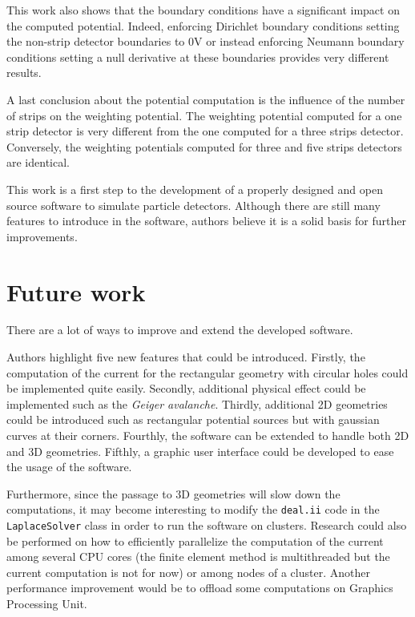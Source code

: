 \documentclass[11pt]{article}
\begin{document}
	This work also shows that the boundary conditions have a significant impact
	on the computed potential. Indeed, enforcing Dirichlet boundary conditions setting
	the non-strip detector boundaries to 0V or instead enforcing Neumann boundary
	conditions setting a null derivative at these boundaries provides very
	different results.

  A last conclusion about the potential computation is the influence of the
	number of strips on the weighting potential. The weighting potential computed
	for a one strip detector is very different from the one computed for a three
	strips detector. Conversely, the weighting potentials computed for three and five
	strips detectors are identical.


	This work is a first step to the development of a properly designed and open source
	software to simulate particle detectors. Although there are still
	many features to introduce in the software, authors believe it is a solid
	basis for further improvements.



	\section*{Future work}

		There are a lot of ways to improve and extend the developed software.

		Authors highlight five new features that could be introduced. Firstly, the
		computation of the current for the
		rectangular geometry with circular holes could be implemented quite easily.
		Secondly, additional physical effect
		could be implemented such as the \textit{Geiger avalanche}. Thirdly,
		additional 2D geometries could be introduced such as
		rectangular potential sources but with gaussian curves at their corners.
		Fourthly, the software can be extended to handle both 2D and 3D geometries.
		Fifthly, a graphic user interface could be developed to ease the usage of the
		software.

		Furthermore, since the passage to 3D geometries will slow down the computations,
		it may become interesting to modify the \texttt{deal.ii} code in the
		\texttt{LaplaceSolver} class in order to run the software on clusters.
		Research could also be performed on how to efficiently parallelize the
		computation of the current among several CPU cores (the finite element method
		is multithreaded but the current computation is not for now) or among nodes of a cluster.
		Another performance improvement would be to offload some computations on
		Graphics Processing Unit.
\end{document}
